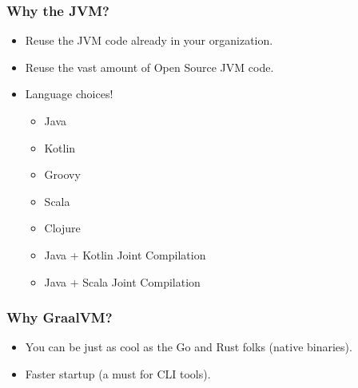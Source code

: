    \begin{frame}[label=lito]
        \frametitle{Why the JVM?}
        \begin{itemize}
            \item{Reuse the JVM code already in your organization.}
            \item<2->{Reuse the vast amount of Open Source JVM code.}
            \item<3->{Language choices!\pause
               \begin{itemize}
                  \item<4->{Java}
                  \item<4->{Kotlin}
                  \item<4->{Groovy}
                  \item<4->{Scala}
                  \item<4->{Clojure}
                  \item<5->{Java + Kotlin Joint Compilation}
                  \item<5->{Java + Scala Joint Compilation}
               \end{itemize}
            }\pause

        \end{itemize}
    \end{frame}

    \begin{frame}[label=lito]
        \frametitle{Why GraalVM?}
        \begin{itemize}
            \item<1->{You can be just as cool as the Go and Rust folks (native binaries).}
            \item<2->{Faster startup (a must for CLI tools).}
        \end{itemize}
    \end{frame}

